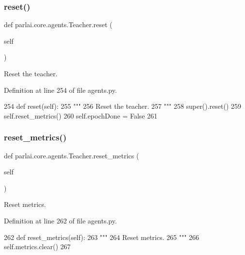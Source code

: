 \subsubsection{\texorpdfstring{reset()}{reset()}}
{\footnotesize\ttfamily def parlai.\+core.\+agents.\+Teacher.\+reset (\begin{DoxyParamCaption}\item[{}]{self }\end{DoxyParamCaption})}

\begin{DoxyVerb}Reset the teacher.
\end{DoxyVerb}
 

Definition at line 254 of file agents.\+py.


\begin{DoxyCode}
254     \textcolor{keyword}{def }reset(self):
255         \textcolor{stringliteral}{"""}
256 \textcolor{stringliteral}{        Reset the teacher.}
257 \textcolor{stringliteral}{        """}
258         super().reset()
259         self.reset\_metrics()
260         self.epochDone = \textcolor{keyword}{False}
261 
\end{DoxyCode}
\mbox{\label{classparlai_1_1core_1_1agents_1_1Teacher_a3f14618f0f49c57a6fbcb4f80f8a1de4}} 
\subsubsection{\texorpdfstring{reset\+\_\+metrics()}{reset\_metrics()}}
{\footnotesize\ttfamily def parlai.\+core.\+agents.\+Teacher.\+reset\+\_\+metrics (\begin{DoxyParamCaption}\item[{}]{self }\end{DoxyParamCaption})}

\begin{DoxyVerb}Reset metrics.
\end{DoxyVerb}
 

Definition at line 262 of file agents.\+py.


\begin{DoxyCode}
262     \textcolor{keyword}{def }reset\_metrics(self):
263         \textcolor{stringliteral}{"""}
264 \textcolor{stringliteral}{        Reset metrics.}
265 \textcolor{stringliteral}{        """}
266         self.metrics.clear()
267 
\end{DoxyCode}
\mbox{\label{classparlai_1_1core_1_1agents_1_1Teacher_a43cf8d0b49ef4ff150ceef0149c063c3}} 
